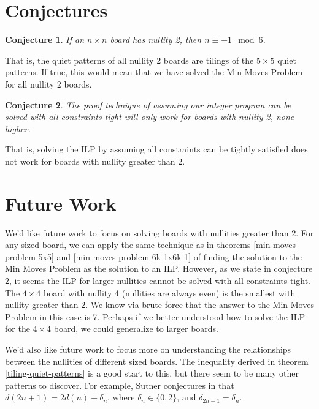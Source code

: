 \documentclass[a4paper]{article}
\newtheorem{conjecture}{Conjecture}
\begin{document}
	\section{Conjectures}
	\begin{conjecture}
		If an $n \times n$ board has nullity 2, then $n \equiv -1 \mod 6$.
	\end{conjecture}
	That is, the quiet patterns of all nullity 2 boards are tilings of the $5 \times 5$ quiet patterns.
	If true, this would mean that we have solved the Min Moves Problem for all nullity 2 boards.

	\begin{conjecture}\label{ilp-conj}
		The proof technique of assuming our integer program can be solved with all constraints tight will only work for boards with nullity 2, none higher.
	\end{conjecture}
	That is, solving the ILP by assuming all constraints can be tightly satisfied does not work for boards with nullity greater than 2.
	
	\section{Future Work}
	We'd like future work to focus on solving boards with nullities greater than 2.
	For any sized board, we can apply the same technique as in theorems \ref{min-moves-problem-5x5} and \ref{min-moves-problem-6k-1x6k-1} of finding the solution to the Min Moves Problem as the solution to an ILP.
	However, as we state in conjecture \ref{ilp-conj}, it seems the ILP for larger nullities cannot be solved with all constraints tight.
	The $4 \times 4$ board with nullity 4 (nullities are always even) is the smallest with nullity greater than 2.
	We know via brute force that the answer to the Min Moves Problem in this case is 7.
	Perhaps if we better understood how to solve the ILP for the $4 \times 4$ board, we could generalize to larger boards.
	
	We'd also like future work to focus more on understanding the relationships between the nullities of different sized boards.
	The inequality derived in theorem \ref{tiling-quiet-patterns} is a good start to this, but there seem to be many other patterns to discover.
	For example, Sutner conjectures in \cite{Sutner1989} that $d(2n+1) = 2d(n) + \delta_n$, where $\delta_n \in \{0,2\}$, and $\delta_{2n+1} = \delta_n$.

	\newpage
	
	
\end{document}
